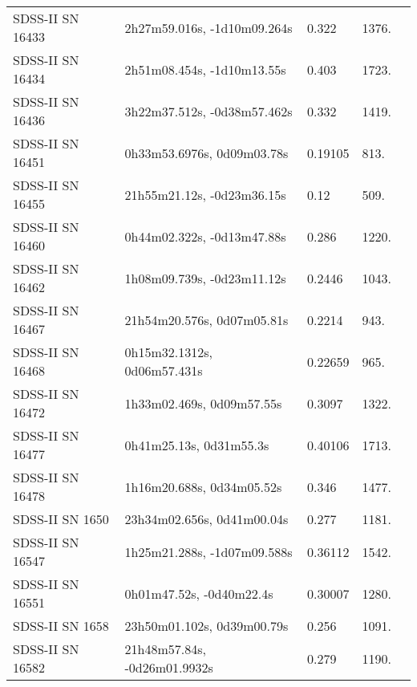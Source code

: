 \begin{longtable}{lllll}
 SDSS-II SN 16433 &    2h27m59.016s, -1d10m09.264s &    0.322 &          1376. &    \citet{2011ApJ...738..162S} \\
 SDSS-II SN 16434 &     2h51m08.454s, -1d10m13.55s &    0.403 &          1723. &    \citet{2011ApJ...738..162S} \\
 SDSS-II SN 16436 &    3h22m37.512s, -0d38m57.462s &    0.332 &          1419. &    \citet{2011ApJ...738..162S} \\
 SDSS-II SN 16451 &     0h33m53.6976s, 0d09m03.78s &  0.19105 &           813. &    \citet{2016SDSSD.C...0000:} \\
 SDSS-II SN 16455 &     21h55m21.12s, -0d23m36.15s &     0.12 &           509. &    \citet{2011ApJ...738..162S} \\
 SDSS-II SN 16460 &     0h44m02.322s, -0d13m47.88s &    0.286 &          1220. &    \citet{2010ApJ...713.1026D} \\
 SDSS-II SN 16462 &     1h08m09.739s, -0d23m11.12s &   0.2446 &          1043. &    \citet{2011ApJ...738..162S} \\
 SDSS-II SN 16467 &     21h54m20.576s, 0d07m05.81s &   0.2214 &           943. &    \citet{2011ApJ...738..162S} \\
 SDSS-II SN 16468 &    0h15m32.1312s, 0d06m57.431s &  0.22659 &           965. &    \citet{2016SDSSD.C...0000:} \\
 SDSS-II SN 16472 &      1h33m02.469s, 0d09m57.55s &   0.3097 &          1322. &    \citet{2011ApJ...738..162S} \\
 SDSS-II SN 16477 &        0h41m25.13s, 0d31m55.3s &  0.40106 &          1713. &    \citet{2013ApJ...763...88C} \\
 SDSS-II SN 16478 &      1h16m20.688s, 0d34m05.52s &    0.346 &          1477. &    \citet{2011ApJ...738..162S} \\
  SDSS-II SN 1650 &     23h34m02.656s, 0d41m00.04s &    0.277 &          1181. &    \citet{2011ApJ...738..162S} \\
 SDSS-II SN 16547 &    1h25m21.288s, -1d07m09.588s &  0.36112 &          1542. &    \citet{2016SDSSD.C...0000:} \\
 SDSS-II SN 16551 &       0h01m47.52s, -0d40m22.4s &  0.30007 &          1280. &    \citet{2016SDSSD.C...0000:} \\
  SDSS-II SN 1658 &     23h50m01.102s, 0d39m00.79s &    0.256 &          1091. &    \citet{2010ApJ...713.1026D} \\
 SDSS-II SN 16582 &   21h48m57.84s, -0d26m01.9932s &    0.279 &          1190. &    \citet{2011ApJ...738..162S} \\

\end{longtable}
